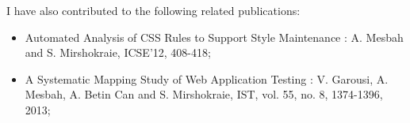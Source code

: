 I have also contributed to the following related publications:
\begin{itemize} [noitemsep, nolistsep]
\item Automated Analysis of CSS Rules to Support Style Maintenance \cite{mesbah:icse12}: 
A. Mesbah and S. Mirshokraie, ICSE'12, 408-418;
\item A Systematic Mapping Study of Web Application Testing \cite{garousi:ist13}: 
V. Garousi, A. Mesbah, A. Betin Can and S. Mirshokraie, IST, vol. 55, no. 8, 1374-1396, 2013;
\end{itemize}
